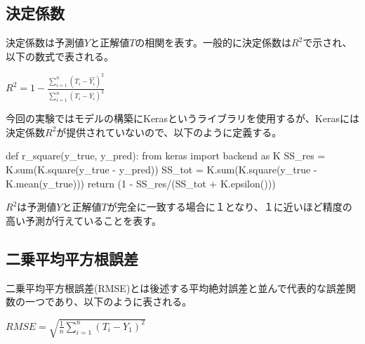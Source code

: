 \documentclass{report}
\begin{document}
\subsection{決定係数}

決定係数は予測値\begin{math}Y\end{math}と正解値\begin{math}T\end{math}の相関を表す。一般的に決定係数は\begin{math}R^2\end{math}で示され、以下の数式で表される。

\begin{center}
\begin{math}R^2=1-\frac{\sum_{i=1}^{n}(T_i-\hat{Y_i})^2}{\sum_{i=1}^{n}(T_i-\bar{Y_i})^2}\end{math}
\end{center}

今回の実験ではモデルの構築にKerasというライブラリを使用するが、Kerasには決定係数\begin{math}R^2\end{math}が提供されていないので、以下のように定義する。
\\

\begin{python}[caption=決定係数]
def r_square(y_true, y_pred):
    from keras import backend as K
    SS_res =  K.sum(K.square(y_true - y_pred)) 
    SS_tot = K.sum(K.square(y_true - K.mean(y_true))) 
    return (1 - SS_res/(SS_tot + K.epsilon()))
\end{python}

\begin{math}R^2\end{math}は予測値\begin{math}Y\end{math}と正解値\begin{math}T\end{math}が完全に一致する場合に１となり、１に近いほど精度の高い予測が行えていることを表す。


\subsection{二乗平均平方根誤差}

二乗平均平方根誤差(RMSE)とは後述する平均絶対誤差と並んで代表的な誤差関数の一つであり、以下のように表される。


\begin{center}
\begin{math}
RMSE = \sqrt{\frac{1}{n} \sum_{i=1}^{n}(T_i - Y_1)^2} 
\end{math}
\end{center}
\end{document}
